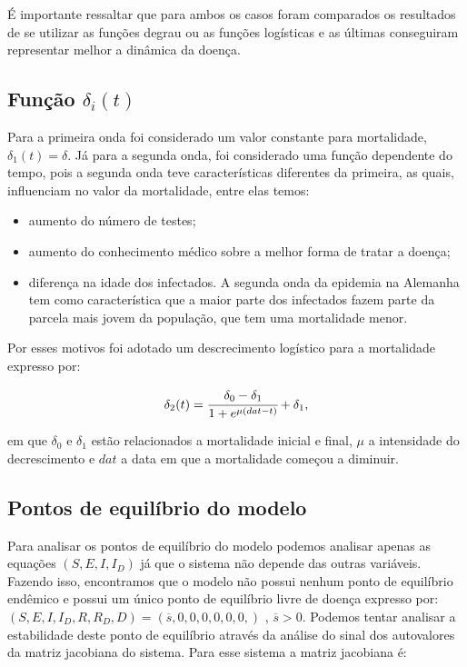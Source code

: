 \documentclass[12pt]{article}
\begin{document}
É importante ressaltar que para ambos os casos foram comparados os resultados de se utilizar as funções degrau ou as funções logísticas e as últimas conseguiram representar melhor a dinâmica da doença.


\subsection{Função $\delta_i(t)$}

Para a primeira onda foi considerado um valor constante para mortalidade, $\delta_1(t) = \delta$. Já para a segunda onda, foi considerado uma função dependente do tempo, pois a segunda onda teve características diferentes da primeira, as quais, influenciam no valor da mortalidade, entre elas temos:

\begin{itemize}
    \item aumento do número de testes;
    \item aumento do conhecimento médico sobre a melhor forma de tratar a doença;
    \item diferença na idade dos infectados. A segunda onda da epidemia na Alemanha tem como característica que a maior parte dos infectados fazem parte da parcela mais jovem da população, que tem uma mortalidade menor.
\end{itemize}
Por esses motivos foi adotado um descrecimento logístico para a mortalidade expresso por: 

$$\delta_2(t) = \cfrac{\delta_0 - \delta_1}{1 + e^{\mu(dat - t)}} + \delta_1,$$

\noindent em que $\delta_0$ e $\delta_1$ estão relacionados a mortalidade inicial e final, $\mu$ a intensidade do decrescimento e $dat$ a data em que a mortalidade começou a diminuir.



\subsection{Pontos de equilíbrio do modelo}

Para analisar os pontos de equilíbrio do modelo podemos analisar apenas as equações $(S,E,I,I_D)$ já que o sistema não depende das outras variáveis. Fazendo isso, encontramos que  o modelo não possui nenhum ponto de equilíbrio endêmico e possui um único ponto de equilíbrio livre de doença expresso por: $(S, E, I,I_D, R, R_D, D) = (\overline{s}, 0,0,0,0,0,0,)$ , $\overline{s} > 0$. Podemos tentar analisar a estabilidade deste ponto de equilíbrio através da análise do sinal dos autovalores da matriz jacobiana do sistema. Para esse sistema a matriz jacobiana é:
\end{document}
